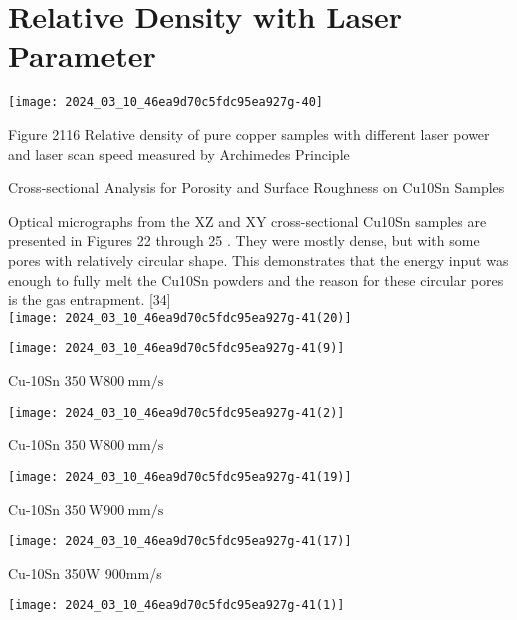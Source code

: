 \documentclass[10pt]{article}
\begin{document}
\section*{Relative Density with Laser Parameter}
\begin{center}
\texttt{[image: 2024\_03\_10\_46ea9d70c5fdc95ea927g-40]}
\end{center}

Figure 2116 Relative density of pure copper samples with different laser power and laser scan speed measured by Archimedes Principle

Cross-sectional Analysis for Porosity and Surface Roughness on Cu10Sn Samples

Optical micrographs from the XZ and XY cross-sectional Cu10Sn samples are presented in Figures 22 through 25 . They were mostly dense, but with some pores with relatively circular shape. This demonstrates that the energy input was enough to fully melt the Cu10Sn powders and the reason for these circular pores is the gas entrapment. [34]\\
\texttt{[image: 2024\_03\_10\_46ea9d70c5fdc95ea927g-41(20)]}

\begin{center}
\texttt{[image: 2024\_03\_10\_46ea9d70c5fdc95ea927g-41(9)]}
\end{center}

Cu-10Sn $350 \mathrm{~W} 800 \mathrm{~mm} / \mathrm{s}$

\begin{center}
\texttt{[image: 2024\_03\_10\_46ea9d70c5fdc95ea927g-41(2)]}
\end{center}

Cu-10Sn $350 \mathrm{~W} 800 \mathrm{~mm} / \mathrm{s}$

\begin{center}
\texttt{[image: 2024\_03\_10\_46ea9d70c5fdc95ea927g-41(19)]}
\end{center}

Cu-10Sn $350 \mathrm{~W} 900 \mathrm{~mm} / \mathrm{s}$

\begin{center}
\texttt{[image: 2024\_03\_10\_46ea9d70c5fdc95ea927g-41(17)]}
\end{center}

Cu-10Sn 350W 900mm/s

\begin{center}
\texttt{[image: 2024\_03\_10\_46ea9d70c5fdc95ea927g-41(1)]}
\end{center}
\end{document}
